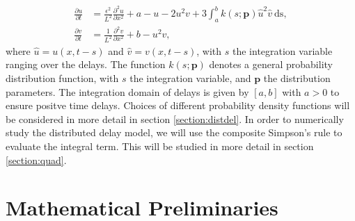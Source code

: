 \begin{equation}\label{distmodel}
  \begin{split}
    \frac{\partial u}{\partial t}&=\frac{\epsilon^2}{L^2}\frac{\partial^2u}{\partial x^2}+a-u-2u^2v+3\int_{a}^{b}k(s;\textbf{p})\hat{u}^2\hat{v} \ \text{ds},\\
    \frac{\partial v}{\partial t}&=\frac{1}{L^2}\frac{\partial^2v}{\partial x^2}+b-u^2v,
\end{split}
\end{equation}
where $\hat{u}=u(x,t-s)$ and $\hat{v}=v(x,t-s)$, with $s$ the integration variable ranging over the delays. The function $k(s;\textbf{p})$ denotes a general probability distribution function, with $s$ the integration variable, and $\textbf{p}$ the distribution parameters. The integration domain of delays is given by $[a,b]$ with $a>0$ to ensure positve time delays.  Choices of different probability density functions will be considered in more detail in section \ref{section:distdel}. In order to numerically study the distributed delay model, we will use the composite Simpson's rule to evaluate the integral term. This will be studied in more detail in section \ref{section:quad}.

\section{Mathematical Preliminaries}
